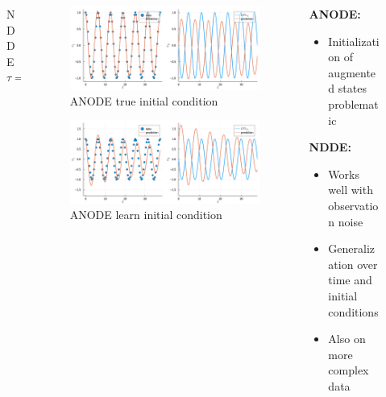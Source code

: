 \documentclass[11pt,aspectratio=169]{beamer}
\begin{document}
\begin{frame}[t]
\begin{columns}[T]
\begin{column}{0.25\textwidth}
\begin{figure}
                \caption{NDDE $\tau=1, K=1$}
            \end{figure}
        \end{column}
        \begin{column}{0.5\textwidth}
            \vspace{-0.5cm}
            \begin{figure}
                \centering
                \includegraphics[width=0.9\columnwidth]{figures/anode_true_init.png}                            \vspace{-0.2cm}
                \caption{ANODE true initial condition}
            \end{figure}
            \vspace{-0.7cm}
            \begin{figure}
                \centering
                \includegraphics[width=0.9\columnwidth]{figures/anode_learn_init.png}
                                            \vspace{-0.2cm}
                \caption{ANODE learn initial condition}
            \end{figure}
        \end{column}
        \begin{column}[T]{0.25\textwidth}
            \textbf{ANODE:}
            \begin{itemize}
                \item Initialization of augmented states problematic
            \end{itemize}
            \textbf{NDDE:}
            \begin{itemize}
                \item Works well with observation noise
                \item Generalization over time and initial conditions
                \item Also on more complex data
            \end{itemize}
        \end{column}
    \end{columns}
\end{frame}
\end{document}
